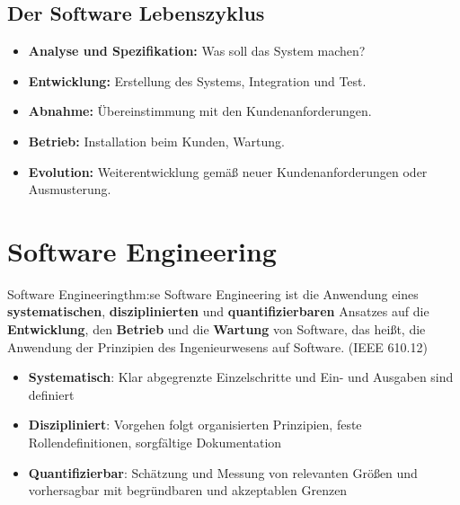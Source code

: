 \documentclass[main.tex]{subfiles}
\begin{document}
\subsection*{Der Software Lebenszyklus}
\begin{itemize}
    \item \textbf{Analyse und Spezifikation:} Was soll das System machen?
    \item \textbf{Entwicklung:} Erstellung des Systems, Integration und Test.
    \item \textbf{Abnahme:} Übereinstimmung mit den Kundenanforderungen.
    \item \textbf{Betrieb:} Installation beim Kunden, Wartung.
    \item \textbf{Evolution:} Weiterentwicklung gemäß neuer Kundenanforderungen oder Ausmusterung.
\end{itemize}

\section{Software Engineering}
\begin{myTheorem}{Software Engineering}{thm:se}
Software Engineering ist die Anwendung eines
\textbf{systematischen}, \textbf{disziplinierten} und \textbf{quantifizierbaren}
Ansatzes auf die \textbf{Entwicklung}, den \textbf{Betrieb} und die \textbf{Wartung}
von Software, das heißt, die Anwendung der Prinzipien des
Ingenieurwesens auf Software. (IEEE 610.12)
\end{myTheorem}

\begin{itemize}
    \item \textbf{Systematisch}: Klar abgegrenzte Einzelschritte und Ein- und Ausgaben sind definiert
    \item \textbf{Diszipliniert}: Vorgehen folgt organisierten Prinzipien, feste Rollendefinitionen, sorgfältige Dokumentation
    \item \textbf{Quantifizierbar}: Schätzung und Messung von relevanten Größen und vorhersagbar mit begründbaren und akzeptablen Grenzen
\end{itemize}
\end{document}
